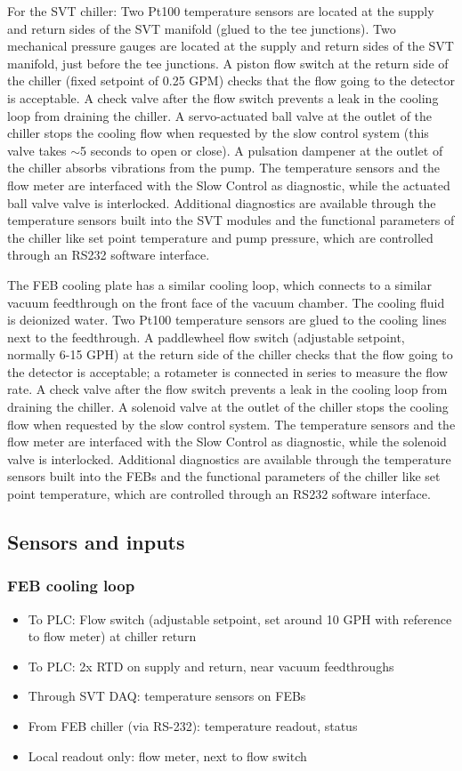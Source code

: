 \documentclass[12pt]{report}
\begin{document}
For the SVT chiller: Two Pt100 temperature sensors are located at the supply and return sides of the SVT manifold (glued to the tee junctions). Two mechanical pressure gauges are located at the supply and return sides of the SVT manifold, just before the tee junctions. A piston flow switch at the return side of the chiller (fixed setpoint of 0.25 GPM) checks that the flow going to the detector is acceptable. A check valve after the flow switch prevents a leak in the cooling loop from draining the chiller. A servo-actuated ball valve at the outlet of the chiller stops the cooling flow when requested by the slow control system (this valve takes $\sim$5 seconds to open or close). A pulsation dampener at the outlet of the chiller absorbs vibrations from the pump. The temperature sensors and the flow meter are interfaced with the Slow Control as diagnostic, while the actuated ball valve valve is interlocked. Additional diagnostics are available through the temperature sensors built into the SVT modules and the functional parameters of the chiller like set point temperature and pump pressure, which are controlled through an RS232 software interface.

The FEB cooling plate has a similar cooling loop, which connects to a similar vacuum feedthrough on the front face of the vacuum chamber. The cooling fluid is deionized water. Two Pt100 temperature sensors are glued to the cooling lines next to the feedthrough. A paddlewheel flow switch (adjustable setpoint, normally 6-15 GPH) at the return side of the chiller checks that the flow going to the detector is acceptable; a rotameter is connected in series to measure the flow rate. A check valve after the flow switch prevents a leak in the cooling loop from draining the chiller. A solenoid valve at the outlet of the chiller stops the cooling flow when requested by the slow control system. The temperature sensors and the flow meter are interfaced with the Slow Control as diagnostic, while the solenoid valve is interlocked. Additional diagnostics are available through the temperature sensors built into the FEBs and the functional parameters of the chiller like set point temperature, which are controlled through an RS232 software interface.

\subsection{Sensors and inputs}
\subsubsection*{FEB cooling loop}
\begin{itemize}
    \item To PLC: Flow switch (adjustable setpoint, set around 10 GPH with reference to flow meter) at chiller return
    \item To PLC: 2x RTD on supply and return, near vacuum feedthroughs
    \item Through SVT DAQ: temperature sensors on FEBs
    \item From FEB chiller (via RS-232): temperature readout, status
    \item Local readout only: flow meter, next to flow switch
\end{itemize}
\end{document}
